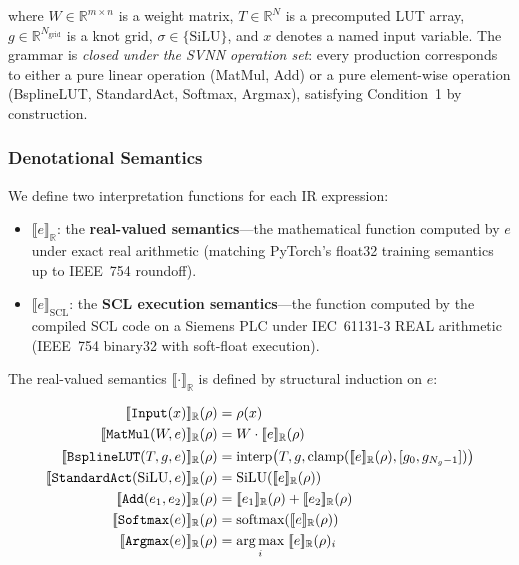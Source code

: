where $W \in \mathbb{R}^{m \times n}$ is a weight matrix,
$T \in \mathbb{R}^{N}$ is a precomputed LUT array,
$g \in \mathbb{R}^{N_{\text{grid}}}$ is a knot grid,
$\sigma \in \{\text{SiLU}\}$, and $x$ denotes a named input variable.
The grammar is \textit{closed under the SVNN operation set}: every
production corresponds to either a pure linear operation (MatMul, Add)
or a pure element-wise operation (BsplineLUT, StandardAct, Softmax,
Argmax), satisfying Condition~1 by construction.

\subsubsection{Denotational Semantics}

We define two interpretation functions for each IR expression:

\begin{itemize}
    \item $\llbracket e \rrbracket_{\mathbb{R}}$: the
    \textbf{real-valued semantics}---the mathematical function computed
    by $e$ under exact real arithmetic (matching PyTorch's float32
    training semantics up to IEEE~754 roundoff).

    \item $\llbracket e \rrbracket_{\text{SCL}}$: the
    \textbf{SCL execution semantics}---the function computed by the
    compiled SCL code on a Siemens PLC under IEC~61131-3 REAL
    arithmetic (IEEE~754 binary32 with soft-float execution).
\end{itemize}

The real-valued semantics $\llbracket \cdot \rrbracket_{\mathbb{R}}$
is defined by structural induction on $e$:

\begin{align}
\llbracket \texttt{Input}(x) \rrbracket_{\mathbb{R}}(\rho) &= \rho(x) \\
\llbracket \texttt{MatMul}(W, e) \rrbracket_{\mathbb{R}}(\rho) &= W \cdot \llbracket e \rrbracket_{\mathbb{R}}(\rho) \\
\llbracket \texttt{BsplineLUT}(T, g, e) \rrbracket_{\mathbb{R}}(\rho) &=
\text{interp}\bigl(T, g, \text{clamp}(\llbracket e \rrbracket_{\mathbb{R}}(\rho),
[g_0, g_{N_g-1}])\bigr) \\
\llbracket \texttt{StandardAct}(\text{SiLU}, e) \rrbracket_{\mathbb{R}}(\rho) &=
\text{SiLU}(\llbracket e \rrbracket_{\mathbb{R}}(\rho)) \\
\llbracket \texttt{Add}(e_1, e_2) \rrbracket_{\mathbb{R}}(\rho) &=
\llbracket e_1 \rrbracket_{\mathbb{R}}(\rho) + \llbracket e_2 \rrbracket_{\mathbb{R}}(\rho) \\
\llbracket \texttt{Softmax}(e) \rrbracket_{\mathbb{R}}(\rho) &=
\text{softmax}(\llbracket e \rrbracket_{\mathbb{R}}(\rho)) \\
\llbracket \texttt{Argmax}(e) \rrbracket_{\mathbb{R}}(\rho) &=
\argmax_i\; \llbracket e \rrbracket_{\mathbb{R}}(\rho)_i
\end{align}

